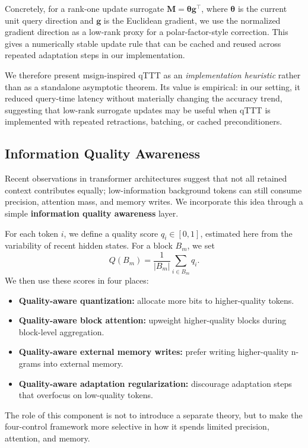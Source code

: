 \documentclass[11pt,a4paper]{article}
\theoremstyle{plain}
\theoremstyle{definition}
\begin{document}
Concretely, for a rank-one update surrogate $\mathbf{M}=\boldsymbol{\theta}\mathbf{g}^{\top}$, where $\boldsymbol{\theta}$ is the current unit query direction and $\mathbf{g}$ is the Euclidean gradient, we use the normalized gradient direction as a low-rank proxy for a polar-factor-style correction. This gives a numerically stable update rule that can be cached and reused across repeated adaptation steps in our implementation.

We therefore present msign-inspired qTTT as an \emph{implementation heuristic} rather than as a standalone asymptotic theorem. Its value is empirical: in our setting, it reduced query-time latency without materially changing the accuracy trend, suggesting that low-rank surrogate updates may be useful when qTTT is implemented with repeated retractions, batching, or cached preconditioners.

\subsection{Information Quality Awareness}
\label{sec:quality}
Recent observations in transformer architectures suggest that not all retained context contributes equally; low-information background tokens can still consume precision, attention mass, and memory writes. We incorporate this idea through a simple \textbf{information quality awareness} layer.

For each token $i$, we define a quality score $q_i\in[0,1]$, estimated here from the variability of recent hidden states. For a block $B_m$, we set
\[
Q(B_m)=\frac{1}{|B_m|}\sum_{i\in B_m}q_i.
\]
We then use these scores in four places:
\begin{itemize}
    \item \textbf{Quality-aware quantization:} allocate more bits to higher-quality tokens.
    \item \textbf{Quality-aware block attention:} upweight higher-quality blocks during block-level aggregation.
    \item \textbf{Quality-aware external memory writes:} prefer writing higher-quality n-grams into external memory.
    \item \textbf{Quality-aware adaptation regularization:} discourage adaptation steps that overfocus on low-quality tokens.
\end{itemize}

The role of this component is not to introduce a separate theory, but to make the four-control framework more selective in how it spends limited precision, attention, and memory.
\end{document}
